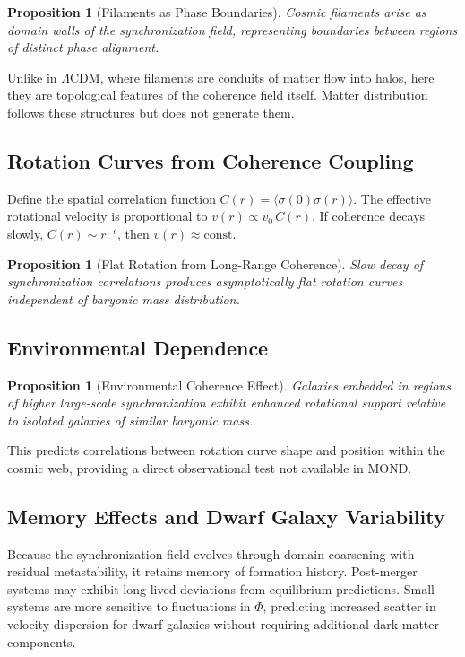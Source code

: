 \documentclass[11pt, a4paper, twocolumn]{article}
\newtheorem{proposition}[definition]{Proposition}
\begin{document}
\begin{proposition}[Filaments as Phase Boundaries]
Cosmic filaments arise as domain walls of the synchronization field, representing
boundaries between regions of distinct phase alignment.
\end{proposition}

Unlike in $\Lambda$CDM, where filaments are conduits of matter flow into halos,
here they are topological features of the coherence field itself. Matter
distribution follows these structures but does not generate them.

\subsection{Rotation Curves from Coherence Coupling}

Define the spatial correlation function $C(r) = \langle\sigma(0)\sigma(r)\rangle$.
The effective rotational velocity is proportional to $v(r) \propto v_0\,C(r)$.
If coherence decays slowly, $C(r) \sim r^{-\epsilon}$, then $v(r) \approx
\mathrm{const}$.

\begin{proposition}[Flat Rotation from Long-Range Coherence]
Slow decay of synchronization correlations produces asymptotically flat rotation
curves independent of baryonic mass distribution.
\end{proposition}

\subsection{Environmental Dependence}

\begin{proposition}[Environmental Coherence Effect]
Galaxies embedded in regions of higher large-scale synchronization exhibit
enhanced rotational support relative to isolated galaxies of similar baryonic
mass.
\end{proposition}

This predicts correlations between rotation curve shape and position within the
cosmic web, providing a direct observational test not available in MOND.

\subsection{Memory Effects and Dwarf Galaxy Variability}

Because the synchronization field evolves through domain coarsening with
residual metastability, it retains memory of formation history. Post-merger
systems may exhibit long-lived deviations from equilibrium predictions. Small
systems are more sensitive to fluctuations in $\Phi$, predicting increased
scatter in velocity dispersion for dwarf galaxies without requiring additional
dark matter components.
\end{document}
